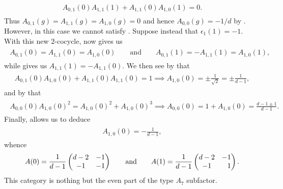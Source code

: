 \begin{example}
\begin{align*}
\begin{split}
A_{0,1}(0) A_{1,1}(1) + A_{1,1}(0) A_{1,0}(1) = 0.
\end{split}
\end{align*}
\noindent Thus $A_{0,1}(g) = A_{1,1}(g) = A_{1,0}(g) = 0$ and hence $A_{0,0}(g) = -1/d$ by \cite[Equation (4.3)]{Izu18}. However, in this case we cannot satisfy \cite[Equation (4.9)]{Izu18}. Suppose instead that $\epsilon_1(1) = -1$. With this new $2$-cocycle, \cite[Equation (4.7)]{Izu18} now gives us
\begin{align*}
\begin{split}
A_{0,1}(0) = A_{1,1}(0) = A_{1,0}(0)\qquad\text{and}\qquad A_{0,1}(1) = -A_{1,1}(1) = A_{1,0}(1),
\end{split}
\end{align*}
\noindent while \cite[Equation (4.8)]{Izu18} gives us $A_{1,1}(1) = -A_{1,1}(0)$. We then see by \cite[Equation (4.4)]{Izu18} that
\begin{align*}
\begin{split}
A_{0,1}(0) A_{1,0}(0) + A_{1,1}(0) A_{1,1}(0) = 1 \implies A_{1,0}(0) = \pm\frac{1}{\sqrt{2}} = \pm\frac{1}{d-1},
\end{split}
\end{align*}
\noindent and by \cite[Equation (4.9)]{Izu18} that
\begin{align*}
\begin{split}
A_{0,0}(0)A_{1,0}(0)^2 = A_{1,0}(0)^2 + A_{1,0}(0)^3 \implies A_{0,0}(0) = 1 + A_{1,0}(0) = \frac{d-1 \pm 1}{d-1}.
\end{split}
\end{align*}
\noindent Finally, \cite[Equation (4.3)]{Izu18} allows us to deduce
\begin{align*}
\begin{split}
A_{1,0}(0) = -\frac{1}{d-1},
\end{split}
\end{align*}
\noindent whence
\begin{align*}
\begin{split}
A(0) = \frac{1}{d-1}\begin{pmatrix}d-2 & -1\\ -1 & -1\end{pmatrix}\qquad\text{and}\qquad A(1) = \frac{1}{d-1}\begin{pmatrix}d-2 & -1\\ -1 & \hphantom{-}1\end{pmatrix}.
\end{split}
\end{align*}
\noindent This category is nothing but the even part of the type $A_7$ subfactor.\\
\end{example}
\newpage

